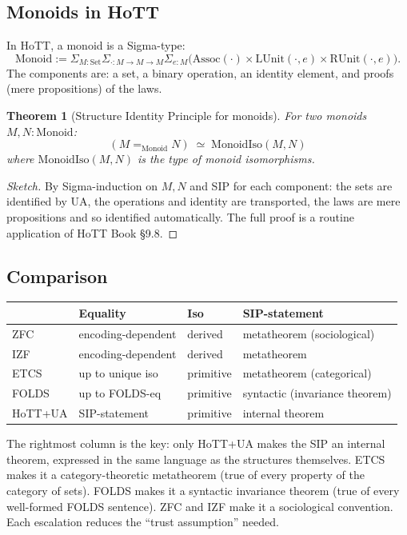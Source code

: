 \documentclass[12pt]{article}
\newtheorem{theorem}{Theorem}[section]
\theoremstyle{definition}
\theoremstyle{remark}
\begin{document}
\subsection{Monoids in HoTT}

In HoTT, a monoid is a Sigma-type:
\[
\mathrm{Monoid} := \Sigma_{M:\mathrm{Set}}\Sigma_{\cdot: M\to M\to M}\Sigma_{e:M}
\bigl(\mathrm{Assoc}(\cdot)\times \mathrm{LUnit}(\cdot,e)\times \mathrm{RUnit}(\cdot,e)\bigr).
\]
The components are: a set, a binary operation, an identity element, and proofs (mere
propositions) of the laws.

\begin{theorem}[Structure Identity Principle for monoids]
\label{thm:sipmonoid}
For two monoids $M, N: \mathrm{Monoid}$:
\[
(M =_{\mathrm{Monoid}} N) \;\simeq\; \mathrm{MonoidIso}(M, N)
\]
where $\mathrm{MonoidIso}(M,N)$ is the type of monoid isomorphisms.
\end{theorem}
\begin{proof}[Sketch]
By Sigma-induction on $M, N$ and SIP for each component: the sets are identified by UA,
the operations and identity are transported, the laws are mere propositions and so
identified automatically. The full proof is a routine application of HoTT Book \S9.8.
\end{proof}

\subsection{Comparison}

\begin{center}
\begin{tabular}{llll}
\toprule
& \textbf{Equality} & \textbf{Iso} & \textbf{SIP-statement} \\
\midrule
ZFC & encoding-dependent & derived & metatheorem (sociological) \\
IZF & encoding-dependent & derived & metatheorem \\
ETCS & up to unique iso & primitive & metatheorem (categorical) \\
FOLDS & up to FOLDS-eq & primitive & syntactic (invariance theorem) \\
HoTT+UA & SIP-statement & primitive & internal theorem \\
\bottomrule
\end{tabular}
\end{center}

The rightmost column is the key: only HoTT+UA makes the SIP an internal theorem, expressed
in the same language as the structures themselves. ETCS makes it a category-theoretic
metatheorem (true of every property of the category of sets). FOLDS makes it a
syntactic invariance theorem (true of every well-formed FOLDS sentence). ZFC and IZF
make it a sociological convention. Each escalation reduces the ``trust assumption'' needed.
\end{document}
